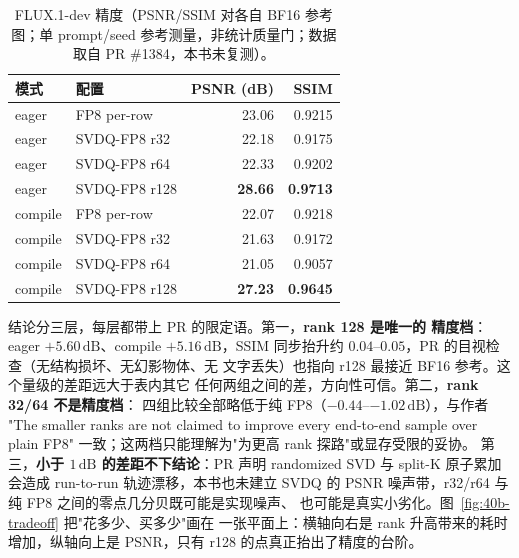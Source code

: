 \begin{table}[H]
\centering\small
\caption{FLUX.1-dev 精度（PSNR/SSIM 对各自 BF16 参考图；单 prompt/seed
参考测量，非统计质量门；数据取自 PR \#1384，本书未复测）。}
\label{tab:40b-acc}
\begin{tabular}{@{}llrr@{}}
\toprule
模式 & 配置 & PSNR (dB) & SSIM \\
\midrule
eager   & FP8 per-row  & 23.06 & 0.9215 \\
eager   & SVDQ-FP8 r32 & 22.18 & 0.9175 \\
eager   & SVDQ-FP8 r64 & 22.33 & 0.9202 \\
eager   & SVDQ-FP8 r128& \textbf{28.66} & \textbf{0.9713} \\
compile & FP8 per-row  & 22.07 & 0.9218 \\
compile & SVDQ-FP8 r32 & 21.63 & 0.9172 \\
compile & SVDQ-FP8 r64 & 21.05 & 0.9057 \\
compile & SVDQ-FP8 r128& \textbf{27.23} & \textbf{0.9645} \\
\bottomrule
\end{tabular}
\end{table}

结论分三层，每层都带上 PR 的限定语。第一，\textbf{rank 128 是唯一的
精度档}：eager $+5.60\,\mathrm{dB}$、compile $+5.16\,\mathrm{dB}$，SSIM
同步抬升约 $0.04$--$0.05$，PR 的目视检查（无结构损坏、无幻影物体、无
文字丢失）也指向 r128 最接近 BF16 参考。这个量级的差距远大于表内其它
任何两组之间的差，方向性可信。第二，\textbf{rank 32/64 不是精度档}：
四组比较全部略低于纯 FP8（$-0.44$--$-1.02\,\mathrm{dB}$），与作者
"The smaller ranks are not claimed to improve every end-to-end sample over
plain FP8" 一致；这两档只能理解为"为更高 rank 探路"或显存受限的妥协。
第三，\textbf{小于 $1\,\mathrm{dB}$ 的差距不下结论}：PR 声明 randomized
SVD 与 split-K 原子累加会造成 run-to-run 轨迹漂移，本书也未建立 SVDQ
的 PSNR 噪声带，r32/r64 与纯 FP8 之间的零点几分贝既可能是实现噪声、
也可能是真实小劣化。图~\ref{fig:40b-tradeoff} 把"花多少、买多少"画在
一张平面上：横轴向右是 rank 升高带来的耗时增加，纵轴向上是 PSNR，只有
r128 的点真正抬出了精度的台阶。

